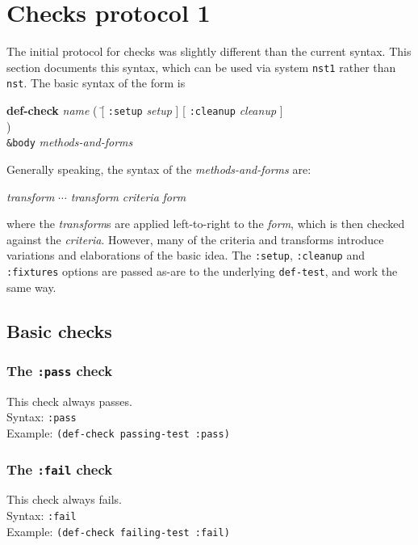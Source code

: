 \documentclass{article}
\begin{document}
\section{Checks protocol 1}
The initial protocol for checks was slightly different than the current syntax.  This section documents this syntax, which can be used via system \texttt{nst1} rather than \texttt{nst}.
The basic syntax of
the form is
\begin{tabbing}\hspace*{1cm}
\textbf{de}\=\textbf{f-check} \textit{name}
	( \= [ \texttt{:setup} \textit{setup} ]
	     [ \texttt{:cleanup} \textit{cleanup} ]
\\ \> )
\\ \> \texttt{\&body} \textit{methods-and-forms}
\end{tabbing}
Generally speaking, the syntax of the \textit{methods-and-forms} are:
\begin{center}
\textit{transform} $\cdots$ \textit{transform} \textit{criteria} \textit{form}
\end{center}
where the \emph{transform}s are applied left-to-right to the
\emph{form}, which is then checked against the \emph{criteria}.
However, many of the criteria and transforms introduce variations and
elaborations of the basic idea.  The \texttt{:setup},
\texttt{:cleanup} and \texttt{:fixtures} options are passed as-are to
the underlying \texttt{def-test}, and work the same way.
\subsection{Basic checks}
\subsubsection{The \texttt{:pass} check} 
This check always passes.
\\ Syntax: \texttt{:pass}
\\ Example: \texttt{(def-check passing-test :pass)}

\subsubsection{The \texttt{:fail} check} 
This check always fails.
\\ Syntax: \texttt{:fail}
\\ Example: \texttt{(def-check failing-test :fail)}
\end{document}

